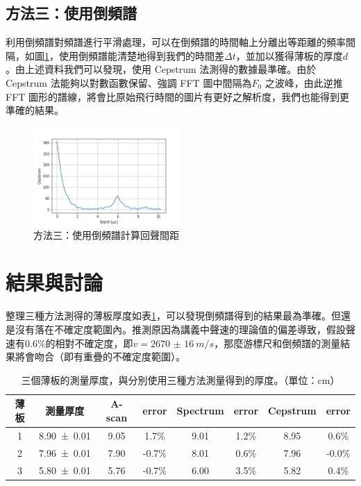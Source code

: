 \documentclass[12pt]{report}
\begin{document}
\subsection{方法三：使用倒頻譜}

利用倒頻譜對頻譜進行平滑處理，可以在倒頻譜的時間軸上分離出等距離的頻率間隔，如圖\ref{fig:05c}，使用倒頻譜能清楚地得到我們的時間差$\Delta t$，並加以獲得薄板的厚度$d$。由上述資料我們可以發現，使用 Cepstrum 法測得的數據最準確。由於 Cepstrum 法能夠以對數函數保留、強調 FFT 圖中間隔為$F_0$ 之波峰，由此逆推 FFT 圖形的譜線，將會比原始飛行時間的圖片有更好之解析度，我們也能得到更準確的結果。

\begin{figure}[htbp]
    \centering
    \includegraphics[width=0.5\textwidth]{PHY05_ceps.png}
    \caption{方法三：使用倒頻譜計算回聲間距}
    \label{fig:05c}
\end{figure}

\section{結果與討論}

整理三種方法測得的薄板厚度如表\ref{tab:phy05}，可以發現倒頻譜得到的結果最為準確。但還是沒有落在不確定度範圍內。推測原因為講義中聲速的理論值的偏差導致，假設聲速有0.6\%的相對不確定度，即$v=\SI{2670(16)}{m/s}$，那麼游標尺和倒頻譜的測量結果將會吻合（即有重疊的不確定度範圍）。

\begin{table}[htbp]
    \centering
    \caption{三個薄板的測量厚度，與分別使用三種方法測量得到的厚度。（單位：cm）}
    \label{tab:phy05}
    \begin{tabular}{@{}cccccccc@{}}
    \toprule
    薄板 & 測量厚度           & A-scan & error  & Spectrum & error & Cepstrum & error  \\ \midrule
    1  & \SI{8.90(1)}{} & 9.05   & 1.7\%  & 9.01     & 1.2\% & 8.95     & 0.6\%  \\
    2  & \SI{7.96(1)}{} & 7.90   & -0.7\% & 8.01     & 0.6\% & 7.96     & -0.0\% \\
    3  & \SI{5.80(1)}{} & 5.76   & -0.7\% & 6.00     & 3.5\% & 5.82     & 0.4\%  \\ \bottomrule
    \end{tabular}
\end{table}
\end{document}
